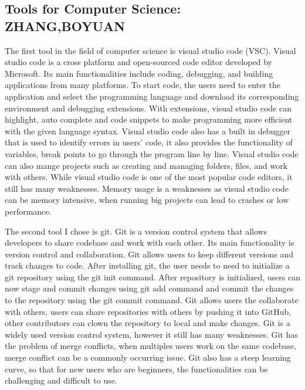\documentclass[a4paper, 11pt]{report}
\begin{document}
\subsection{Tools for Computer Science: ZHANG,BOYUAN}
The first tool in the field of computer science is visual studio code (VSC). Visual studio code is a cross platform and open-sourced code editor developed by Microsoft. Its main functionalities include coding, debugging, and building applications from many platforms.
To start code, the users need to enter the application and select the programming language and download its corresponding environment and debugging extensions. With extensions, visual studio code can highlight, auto complete and code snippets to make programming more efficient with the given language syntax. Visual studio code also has a built in debugger that is used to identify errors in users’ code, it also provides the functionality of variables, break points to go through the program line by line. Visual studio code can also mange projects such as creating and managing folders, files, and work with others.
While visual studio code is one of the most popular code editors, it still has many weaknesses. Memory usage is a weaknesses as visual studio code can be memory intensive, when running big projects can lead to crashes or low performance.

The second tool I chose is git. Git is a version control system that allows developers to share codebase and work with each other. Its main functionality is version control and collaboration. 
Git allows users to keep different versions and track changes to code. After installing git, the user needs to need to initialize a git repository using the git init command. After repository is initialized, users can now stage and commit changes using git add command and commit the changes to the repository using the git commit command. Git allows users the collaborate with others, users can share repositories with others by pushing it into GitHub, other contributors can clown the repository to local and make changes.
Git is a widely used version control system, however it still has many weaknesses. Git has the problem of merge conflicts, when multiples users work on the same codebase, merge conflict can be a commonly occurring issue. Git also has a steep learning curve, so that for new users who are beginners, the functionalities can be challenging and difficult to use.
\end{document}
